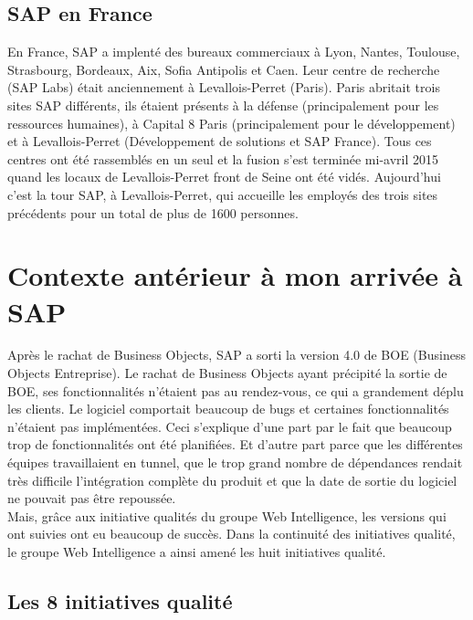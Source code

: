 \subsection{SAP en France}
En France, SAP a implenté des bureaux commerciaux à Lyon, Nantes, Toulouse, Strasbourg, Bordeaux, Aix, Sofia Antipolis et Caen. Leur centre de recherche (SAP Labs) était anciennement à Levallois-Perret (Paris). Paris abritait trois sites SAP différents, ils étaient présents à la défense (principalement pour les ressources humaines), à Capital 8 Paris (principalement pour le développement) et à Levallois-Perret (Développement de solutions et SAP France). Tous ces centres ont été rassemblés en un seul et la fusion s'est terminée mi-avril 2015 quand les locaux de Levallois-Perret front de Seine ont été vidés. Aujourd'hui c'est la tour SAP, à Levallois-Perret, qui accueille les employés des trois sites précédents pour un total de plus de 1600 personnes.

\section{Contexte antérieur à mon arrivée à SAP}

Après le rachat de Business Objects, SAP a sorti la version 4.0 de BOE (Business Objects Entreprise). Le rachat de Business Objects ayant précipité la sortie de BOE, ses fonctionnalités n'étaient pas au rendez-vous, ce qui a grandement déplu les clients. Le logiciel comportait beaucoup de bugs et certaines fonctionnalités n'étaient pas implémentées. 
Ceci s'explique d'une part par le fait que beaucoup trop de fonctionnalités ont été planifiées. Et d'autre part parce que les différentes équipes travaillaient en tunnel, que le trop grand nombre de dépendances rendait très difficile l'intégration complète du produit et que la date de sortie du logiciel ne pouvait pas être repoussée.\\
Mais, gr\^{a}ce aux initiative qualités du groupe Web Intelligence, les versions qui ont suivies ont eu beaucoup de succès. Dans la continuité des initiatives qualité, le groupe Web Intelligence a ainsi amené les huit initiatives qualité.

\subsection{Les 8 initiatives qualité}

